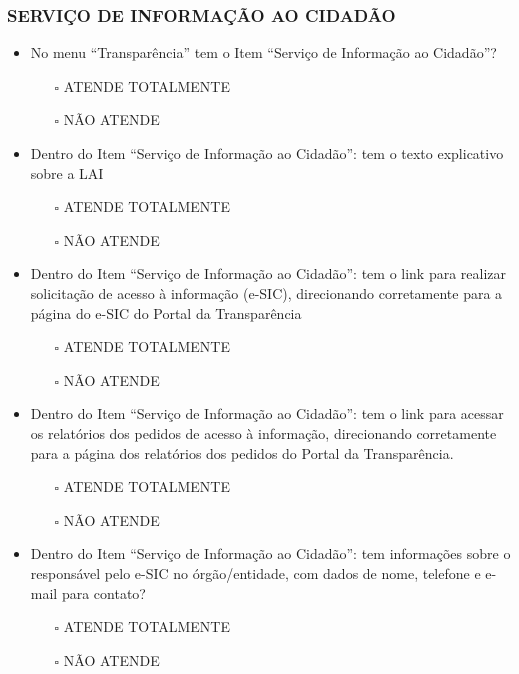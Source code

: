 \documentclass[
]{book}
\providecommand{\tightlist}{%
  \setlength{\itemsep}{0pt}\setlength{\parskip}{0pt}}
\begin{document}
\hypertarget{serviuxe7o-de-informauxe7uxe3o-ao-cidaduxe3o-1}{%
\subsubsection*{SERVIÇO DE INFORMAÇÃO AO CIDADÃO}\label{serviuxe7o-de-informauxe7uxe3o-ao-cidaduxe3o-1}}

\begin{itemize}
\tightlist
\item
  No menu ``Transparência'' tem o Item ``Serviço de Informação ao Cidadão''?

  \begin{itemize}
  \tightlist
  \item[$\square$]
    ATENDE TOTALMENTE
  \item[$\square$]
    NÃO ATENDE
  \end{itemize}
\item
  Dentro do Item ``Serviço de Informação ao Cidadão'': tem o texto explicativo sobre a LAI

  \begin{itemize}
  \tightlist
  \item[$\square$]
    ATENDE TOTALMENTE
  \item[$\square$]
    NÃO ATENDE
  \end{itemize}
\item
  Dentro do Item ``Serviço de Informação ao Cidadão'': tem o link para realizar solicitação de acesso à informação (e-SIC), direcionando corretamente para a página do e-SIC do Portal da Transparência

  \begin{itemize}
  \tightlist
  \item[$\square$]
    ATENDE TOTALMENTE
  \item[$\square$]
    NÃO ATENDE
  \end{itemize}
\item
  Dentro do Item ``Serviço de Informação ao Cidadão'': tem o link para acessar os relatórios dos pedidos de acesso à informação, direcionando corretamente para a página dos relatórios dos pedidos do Portal da Transparência.

  \begin{itemize}
  \tightlist
  \item[$\square$]
    ATENDE TOTALMENTE
  \item[$\square$]
    NÃO ATENDE
  \end{itemize}
\item
  Dentro do Item ``Serviço de Informação ao Cidadão'': tem informações sobre o responsável pelo e-SIC no órgão/entidade, com dados de nome, telefone e e-mail para contato?

  \begin{itemize}
  \tightlist
  \item[$\square$]
    ATENDE TOTALMENTE
  \item[$\square$]
    NÃO ATENDE
  \end{itemize}
\end{itemize}
\end{document}
